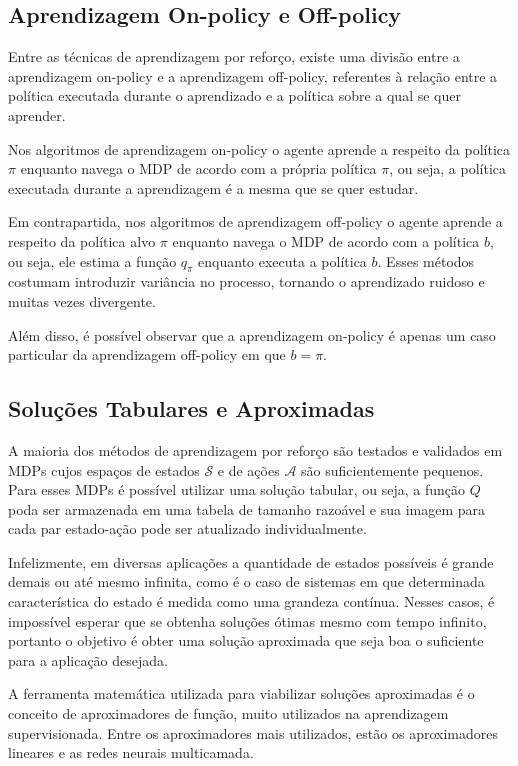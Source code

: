 \subsection{Aprendizagem On-policy e Off-policy}
\label{subsec:on-off-policy}
Entre as técnicas de aprendizagem por reforço, existe uma divisão entre a aprendizagem on-policy e a aprendizagem off-policy, referentes à relação entre a política executada durante o aprendizado e a política sobre a qual se quer aprender.

Nos algoritmos de aprendizagem on-policy o agente aprende a respeito da política $\pi$ enquanto navega o MDP de acordo com a própria política $\pi$, ou seja, a política executada durante a aprendizagem é a mesma que se quer estudar.

Em contrapartida, nos algoritmos de aprendizagem off-policy o agente aprende a respeito da política alvo $\pi$ enquanto navega o MDP de acordo com a política $b$, ou seja, ele estima a função $q_{\pi}$ enquanto executa a política $b$. Esses métodos costumam introduzir variância no processo, tornando o aprendizado ruidoso e muitas vezes divergente.

Além disso, é possível observar que a aprendizagem on-policy é apenas um caso particular da aprendizagem off-policy em que $b = \pi$.

\subsection{Soluções Tabulares e Aproximadas}

A maioria dos métodos de aprendizagem por reforço são testados e validados em MDPs cujos espaços de estados $\mathcal{S}$ e de ações $\mathcal{A}$ são suficientemente pequenos. Para esses MDPs é possível utilizar uma solução tabular, ou seja, a função $Q$ poda ser armazenada em uma tabela de tamanho razoável e sua imagem para cada par estado-ação pode ser atualizado individualmente.

Infelizmente, em diversas aplicações a quantidade de estados possíveis é grande demais ou até mesmo infinita, como é o caso de sistemas em que determinada característica do estado é medida como uma grandeza contínua. Nesses casos, é impossível esperar que se obtenha soluções ótimas mesmo com tempo infinito, portanto o objetivo é obter uma solução aproximada que seja boa o suficiente para a aplicação desejada.

A ferramenta matemática utilizada para viabilizar soluções aproximadas é o conceito de aproximadores de função, muito utilizados na aprendizagem supervisionada. Entre os aproximadores mais utilizados, estão os aproximadores lineares e as redes neurais multicamada.

